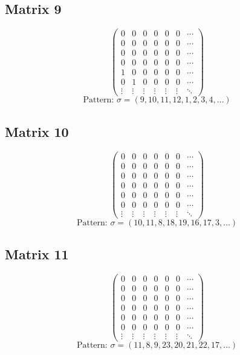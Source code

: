 \documentclass{article}
\begin{document}
\subsection*{Matrix 9}
\[
\begin{pmatrix}
  0 & 0 & 0 & 0 & 0 & 0 & \cdots \\
  0 & 0 & 0 & 0 & 0 & 0 & \cdots \\
  0 & 0 & 0 & 0 & 0 & 0 & \cdots \\
  0 & 0 & 0 & 0 & 0 & 0 & \cdots \\
  1 & 0 & 0 & 0 & 0 & 0 & \cdots \\
  0 & 1 & 0 & 0 & 0 & 0 & \cdots \\
\vdots & \vdots & \vdots & \vdots & \vdots & \vdots & \ddots
\end{pmatrix}
\]
\[
\text{Pattern: } \sigma = (9, 10, 11, 12, 1, 2, 3, 4, \ldots)
\]
\vspace{0.5em}

\subsection*{Matrix 10}
\[
\begin{pmatrix}
  0 & 0 & 0 & 0 & 0 & 0 & \cdots \\
  0 & 0 & 0 & 0 & 0 & 0 & \cdots \\
  0 & 0 & 0 & 0 & 0 & 0 & \cdots \\
  0 & 0 & 0 & 0 & 0 & 0 & \cdots \\
  0 & 0 & 0 & 0 & 0 & 0 & \cdots \\
  0 & 0 & 0 & 0 & 0 & 0 & \cdots \\
\vdots & \vdots & \vdots & \vdots & \vdots & \vdots & \ddots
\end{pmatrix}
\]
\[
\text{Pattern: } \sigma = (10, 11, 8, 18, 19, 16, 17, 3, \ldots)
\]
\vspace{0.5em}

\subsection*{Matrix 11}
\[
\begin{pmatrix}
  0 & 0 & 0 & 0 & 0 & 0 & \cdots \\
  0 & 0 & 0 & 0 & 0 & 0 & \cdots \\
  0 & 0 & 0 & 0 & 0 & 0 & \cdots \\
  0 & 0 & 0 & 0 & 0 & 0 & \cdots \\
  0 & 0 & 0 & 0 & 0 & 0 & \cdots \\
  0 & 0 & 0 & 0 & 0 & 0 & \cdots \\
\vdots & \vdots & \vdots & \vdots & \vdots & \vdots & \ddots
\end{pmatrix}
\]
\[
\text{Pattern: } \sigma = (11, 8, 9, 23, 20, 21, 22, 17, \ldots)
\]
\vspace{0.5em}
\end{document}

